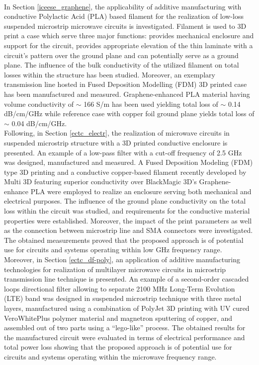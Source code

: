 \\
\indent In Section \ref{iceese_graphene}, the applicability of additive manufacturing with conductive Polylactic Acid (PLA) based filament for the realization of low-loss suspended microstrip microwave circuits is investigated. Filament is used to 3D print a case which serve three major functions: provides mechanical enclosure and support for the circuit, provides appropriate elevation of the thin laminate with a circuit's pattern over the ground plane and can potentially serve as a ground plane. The influence of the bulk conductivity of the utilized filament on total losses within the structure has been studied. Moreover, an exemplary transmission line hosted in Fused Deposition Modelling (FDM) 3D printed case has been manufactured and measured. Graphene-enhanced PLA material having volume conductivity of $\sim$ 166 S/m has been used yielding total loss of $\sim$ 0.14 dB/cm/GHz while reference case with copper foil ground plane yields total loss of $\sim$ 0.04 dB/cm/GHz.
\\
\indent Following, in Section \ref{ectc_electr}, the realization of microwave circuits in suspended microstrip structure with a 3D printed conductive enclosure is presented. An example of a low-pass filter with a cut-off frequency of 2.5 GHz was designed, manufactured and measured. A Fused Deposition Modeling (FDM) type 3D printing and a conductive copper-based filament recently developed by Multi 3D featuring superior conductivity over BlackMagic 3D's Graphene-enhance PLA were employed to realize an enclosure serving both mechanical and electrical purposes. The influence of the ground plane conductivity on the total loss within the circuit was studied, and requirements for the conductive material properties were established. Moreover, the impact of the print parameters as well as the connection between microstrip line and SMA connectors were investigated. The obtained measurements proved that the proposed approach is of potential use for circuits and systems operating within low GHz frequency range.
\\
\indent Moreover, in Section \ref{ectc_df-poly}, an application of additive manufacturing technologies for realization of multilayer microwave circuits in microstrip transmission line technique is presented. An example of a second-order cascaded loops directional filter allowing to separate 2100 MHz Long-Term Evolution (LTE) band was designed in suspended microstrip technique with three metal layers, manufactured using a combination of PolyJet 3D printing with UV cured VeroWhitePlus polymer material and magnetron sputtering of copper, and assembled out of two parts using a “lego-like” process. The obtained results for the manufactured circuit were evaluated in terms of electrical performance and total power loss showing that the proposed approach is of potential use for circuits and systems operating within the microwave frequency range.
